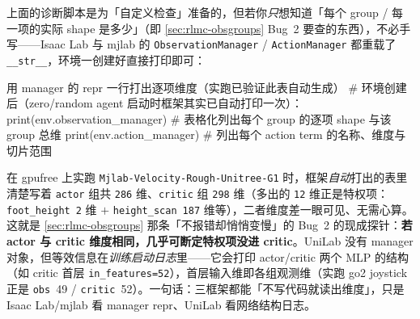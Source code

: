 \begin{insight}\label{ins:rlmc-managerstr}
上面的诊断脚本是为「自定义检查」准备的，但若你\emph{只}想知道「每个 group / 每一项的实际 shape 是多少」（即 \cref{sec:rlmc-obsgroups} Bug~2 要查的东西），不必手写——Isaac Lab 与 mjlab 的 \verb|ObservationManager| / \verb|ActionManager| 都重载了 \verb|__str__|，环境一创建好直接打印即可：
\begin{codebox}[Python]{用 manager 的 repr 一行打出逐项维度（实跑已验证此表自动生成）}
# 环境创建后（zero/random agent 启动时框架其实已自动打印一次）：
print(env.observation_manager)   # 表格化列出每个 group 的逐项 shape 与该 group 总维
print(env.action_manager)        # 列出每个 action term 的名称、维度与切片范围
\end{codebox}
在 gpufree 上实跑 \verb|Mjlab-Velocity-Rough-Unitree-G1| 时，框架\emph{自动}打出的表里清楚写着 \verb|actor| 组共 \texttt{286} 维、\verb|critic| 组 \texttt{298} 维（多出的 \texttt{12} 维正是特权项：\verb|foot_height|~\texttt{2} 维 $+$ \verb|height_scan|~\texttt{187} 维等），二者维度差一眼可见、无需心算。这就是 \cref{sec:rlmc-obsgroups} 那条「不报错却悄悄变慢」的 Bug~2 的现成探针：\textbf{若 actor 与 critic 维度相同，几乎可断定特权项没进 critic}。UniLab 没有 manager 对象，但等效信息在\emph{训练启动日志}里——它会打印 actor/critic 两个 MLP 的结构（如 critic 首层 \verb|in_features=52|），首层输入维即各组观测维（实跑 go2 joystick 正是 \verb|obs|~49 / \verb|critic|~52）。一句话：三框架都能「不写代码就读出维度」，只是 Isaac Lab/mjlab 看 manager repr、UniLab 看网络结构日志。
\end{insight}

